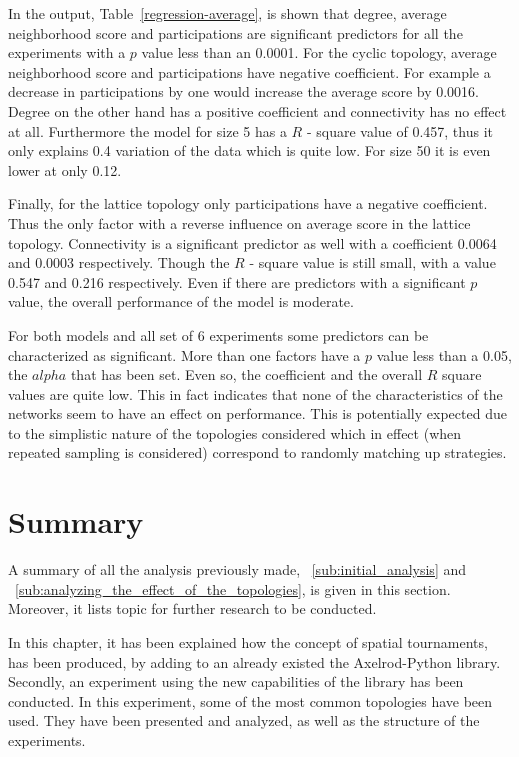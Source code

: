 In the output, Table~\ref{regression-average}, is shown that degree, average
neighborhood score and participations
are significant predictors for all the experiments with a \(p\) value less than
an 0.0001.
For the cyclic topology, average neighborhood score and participations have negative
coefficient. For example a decrease in participations by one would increase
the average score by 0.0016. Degree on the other hand has a positive coefficient
and connectivity has no effect at all. Furthermore the model for size 5 has
a \(R\) - square value of 0.457, thus it only explains 0.4 variation of the data which is
quite low. For size 50 it is even lower at only 0.12.

Finally, for the lattice topology only participations have a negative coefficient.
Thus the only factor with a reverse influence on average score in the lattice topology.
Connectivity is a significant predictor as well with a coefficient 0.0064 and
0.0003 respectively. Though the \(R\) - square value is still  small,
with a value 0.547 and 0.216 respectively.
Even if there are predictors with a significant \(p\) value, the overall
performance of the model is moderate.

For both models and all set of 6 experiments some predictors can be characterized
as significant. More than one factors have a \(p\) value less than a 0.05, the \(alpha\)
that has been set. Even so, the coefficient and the overall \(R\) square values are
quite low. This in fact indicates
that none of the characteristics of the networks seem to have an effect on
performance. This is potentially expected due to the simplistic nature of the
topologies considered which in effect (when repeated sampling is considered)
correspond to randomly matching up strategies.


\section{Summary}
\label{sub:summary}
A summary of all the analysis previously made, ~\autoref{sub:initial_analysis} and
~\autoref{sub:analyzing_the_effect_of_the_topologies}, is given in this section.
Moreover, it lists topic for further research to be conducted.

In this chapter, it has been explained how the concept of spatial tournaments,
has been produced, by adding to an already existed the Axelrod-Python library.
Secondly, an experiment using the new capabilities of the library has been
conducted. In this experiment, some of the most common topologies have been used.
They have been presented and analyzed, as well as the structure of the experiments.

